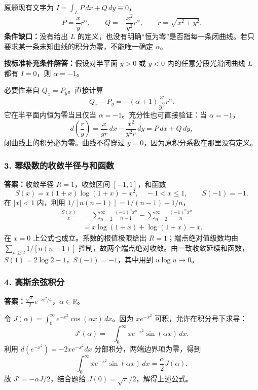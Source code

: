 \documentclass[11pt,fontset=fandol]{ctexart}
\begin{document}
原题现有文字为 \(I=\int_LP\,dx+Q\,dy\equiv0\)， \[
P=\frac xy r^\alpha,\qquad Q=-\frac{x^2}{y^2}r^\alpha,\qquad r=\sqrt{x^2+y^2}.
\] \textbf{条件缺口：}没有给出 \(L\)
的定义，也没有明确``恒为零''是否指每一条闭曲线。若只要求某一条未知曲线的积分为零，不能唯一确定
\(\alpha\)。

\textbf{按标准补充条件解答：}假设对半平面 \(y>0\) 或 \(y<0\)
内的任意分段光滑闭曲线 \(L\) 都有 \(I=0\)，则 \(\boxed{\alpha=-1}\)。

必要性来自 \(Q_x=P_y\)。直接计算 \[
Q_x-P_y=-(\alpha+1)\frac{x}{y^2}r^\alpha.
\] 它在半平面内恒为零当且仅当 \(\alpha=-1\)。充分性也可直接验证：当
\(\alpha=-1\)， \[
d\left(\frac ry\right)
=\frac{x}{yr}\,dx-\frac{x^2}{y^2r}\,dy=P\,dx+Q\,dy,
\] 闭曲线上的积分必为零。曲线不得穿过
\(y=0\)，因为原积分系数在那里没有定义。

\subsubsection{3.
幂级数的收敛半径与和函数}\label{ux5e42ux7ea7ux6570ux7684ux6536ux655bux534aux5f84ux4e0eux548cux51fdux6570}

\textbf{答案：}收敛半径 \(R=1\)，收敛区间 \([-1,1]\)，和函数 \[
\boxed{S(x)=x(1+x)\log(1+x)-x^2},\quad-1<x\le1,
\qquad S(-1)=-1.
\] 在 \(|x|<1\) 内，利用 \(1/[n(n-1)]=1/(n-1)-1/n\)， \[
\begin{aligned}
\frac{S(x)}x
&=\sum_{n=2}^\infty\frac{(-1)^nx^n}{n-1}
-\sum_{n=2}^\infty\frac{(-1)^nx^n}{n}\\
&=x\log(1+x)+\log(1+x)-x.
\end{aligned}
\] 在 \(x=0\) 上公式也成立。系数的根值极限给出
\(R=1\)；端点绝对值级数均由 \(\sum_{n\ge2}1/[n(n-1)]\)
控制，故两个端点绝对收敛。由一致收敛延续和函数，\(S(1)=2\log2-1\)，\(S(-1)=-1\)，其中用到
\(u\log u\to0\)。

\subsubsection{4.
高斯余弦积分}\label{ux9ad8ux65afux4f59ux5f26ux79efux5206}

\textbf{答案：}\(\displaystyle\frac{\sqrt\pi}{2}e^{-\alpha^2/4}\)，\(\alpha\in\mathbb R\)。

令 \(J(\alpha)=\int_0^\infty e^{-x^2}\cos(\alpha x)\,dx\)。因为
\(xe^{-x^2}\) 可积，允许在积分号下求导： \[
J'(\alpha)=-\int_0^\infty xe^{-x^2}\sin(\alpha x)\,dx.
\] 利用 \(d(e^{-x^2})=-2xe^{-x^2}dx\) 分部积分，两端边界项为零，得到 \[
\int_0^\infty xe^{-x^2}\sin(\alpha x)\,dx=\frac\alpha2J(\alpha).
\] 故 \(J'=-\alpha J/2\)，结合题给 \(J(0)=\sqrt\pi/2\)，解得上述公式。
\end{document}
